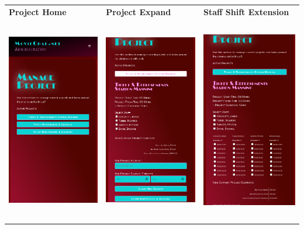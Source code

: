 \documentclass[11pt, english]{article}
\begin{document}
\newpage

	\begin{center}
        	\scriptsize
        \begin{longtable}{p{5cm}p{5cm}p{5cm}}
                \textbf{Project Home} & \textbf{Project Expand} & \textbf{Staff Shift Extension}\\
		\includegraphics[width=5cm,height=9cm]{CS993_IMG/admin7.png} & \includegraphics[width=5cm,height=9cm]{CS993_IMG/admin8.png} & \includegraphics[width=5cm,height=9cm]{CS993_IMG/admin9.png}\\

\end{longtable}
\end{center}
\end{document}
